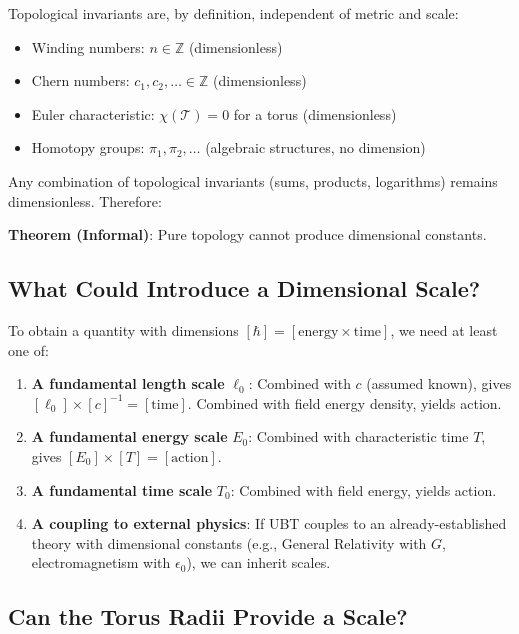 \documentclass[12pt]{article}
\begin{document}
Topological invariants are, by definition, independent of metric and scale:
\begin{itemize}
\item Winding numbers: $n \in \mathbb{Z}$ (dimensionless)
\item Chern numbers: $c_1, c_2, \ldots \in \mathbb{Z}$ (dimensionless)
\item Euler characteristic: $\chi(\mathcal{T}) = 0$ for a torus (dimensionless)
\item Homotopy groups: $\pi_1, \pi_2, \ldots$ (algebraic structures, no dimension)
\end{itemize}

Any combination of topological invariants (sums, products, logarithms) remains dimensionless. Therefore:

\textbf{Theorem (Informal)}: Pure topology cannot produce dimensional constants.

\subsection{What Could Introduce a Dimensional Scale?}

To obtain a quantity with dimensions $[\hbar] = [\text{energy} \times \text{time}]$, we need at least one of:

\begin{enumerate}
\item \textbf{A fundamental length scale} $\ell_0$: Combined with $c$ (assumed known), gives $[\ell_0] \times [c]^{-1} = [\text{time}]$. Combined with field energy density, yields action.

\item \textbf{A fundamental energy scale} $E_0$: Combined with characteristic time $T$, gives $[E_0] \times [T] = [\text{action}]$.

\item \textbf{A fundamental time scale} $T_0$: Combined with field energy, yields action.

\item \textbf{A coupling to external physics}: If UBT couples to an already-established theory with dimensional constants (e.g., General Relativity with $G$, electromagnetism with $\epsilon_0$), we can inherit scales.
\end{enumerate}

\subsection{Can the Torus Radii Provide a Scale?}
\end{document}
